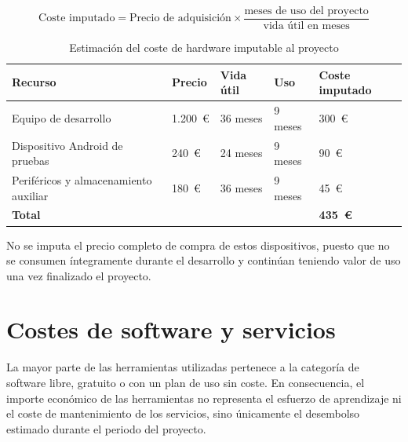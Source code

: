 \[
\text{Coste imputado} =
\text{Precio de adquisición} \times
\frac{\text{meses de uso del proyecto}}{\text{vida útil en meses}}
\]

\begin{table}[H]
    \centering
    \small
    \caption{Estimación del coste de hardware imputable al proyecto}
    \label{tab:costes_hardware}
    \begin{tabular}{|p{5.2cm}|p{1.8cm}|p{1.9cm}|p{1.5cm}|p{2.0cm}|}
        \hline
        \textbf{Recurso} & \textbf{Precio} & \textbf{Vida útil} & \textbf{Uso} & \textbf{Coste imputado} \\
        \hline
        Equipo de desarrollo & 1.200~\euro & 36 meses & 9 meses & 300~\euro \\
        \hline
        Dispositivo Android de pruebas & 240~\euro & 24 meses & 9 meses & 90~\euro \\
        \hline
        Periféricos y almacenamiento auxiliar & 180~\euro & 36 meses & 9 meses & 45~\euro \\
        \hline
        \textbf{Total} & & & & \textbf{435~\euro} \\
        \hline
    \end{tabular}
\end{table}

No se imputa el precio completo de compra de estos dispositivos, puesto que no se consumen íntegramente durante el desarrollo y continúan teniendo valor de uso una vez finalizado el proyecto.

\section{Costes de software y servicios}
\label{sec:costes_software}

La mayor parte de las herramientas utilizadas pertenece a la categoría de software libre, gratuito o con un plan de uso sin coste. En consecuencia, el importe económico de las herramientas no representa el esfuerzo de aprendizaje ni el coste de mantenimiento de los servicios, sino únicamente el desembolso estimado durante el periodo del proyecto.

